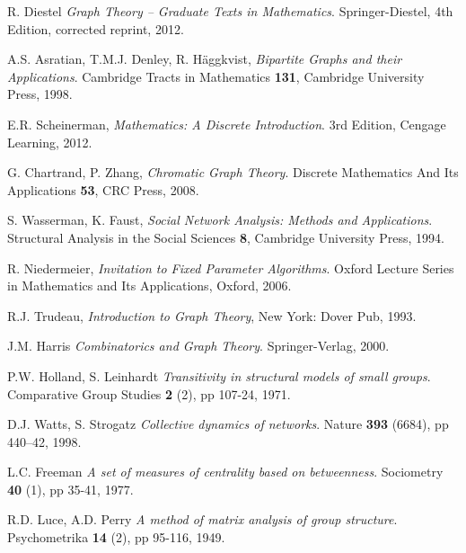 \cleardoublepage
{}
{}
\begin{thebibliography}{99}

    R. Diestel
    \emph{Graph Theory -- Graduate Texts in Mathematics}.
    Springer-Diestel,
    4th Edition, corrected reprint,
    2012.

  A.S. Asratian, T.M.J. Denley, R. Häggkvist,
  \emph{Bipartite Graphs and their Applications}.
  Cambridge Tracts in Mathematics \textbf{131},
  Cambridge University Press,
  1998.

  E.R. Scheinerman, 
  \emph{Mathematics: A Discrete Introduction}.
  3rd Edition,
  Cengage Learning,
  2012.

  G. Chartrand, P. Zhang,
  \emph{Chromatic Graph Theory}.
  Discrete Mathematics And Its Applications \textbf{53},
  CRC Press,
  2008.

  S. Wasserman, K. Faust,
  \emph{Social Network Analysis: Methods and Applications}.
  Structural Analysis in the Social Sciences \textbf{8},
  Cambridge University Press,
  1994.

  R. Niedermeier,
  \emph{Invitation to Fixed Parameter Algorithms}.
  Oxford Lecture Series in Mathematics and Its Applications,
  Oxford,
  2006.

  R.J. Trudeau,
  \emph{Introduction to Graph Theory},
  New York: Dover Pub,
  1993.

  J.M. Harris
  \emph{Combinatorics and Graph Theory}.
  Springer-Verlag,
  2000.
  
  P.W. Holland, S. Leinhardt
  \emph{Transitivity in structural models of small groups}.
  Comparative Group Studies \textbf{2} (2), pp 107-24,
  1971.

  D.J. Watts, S. Strogatz
  \emph{Collective dynamics of  networks}.
  Nature \textbf{393} (6684), pp 440–42,
  1998.
  
  L.C. Freeman
  \emph{A set of measures of centrality based on betweenness}.
  Sociometry \textbf{40} (1), pp 35-41,
  1977.

  R.D. Luce, A.D. Perry
  \emph{A method of matrix analysis of group structure}.
  Psychometrika \textbf{14} (2), pp 95-116,
  1949.


\end{thebibliography}

